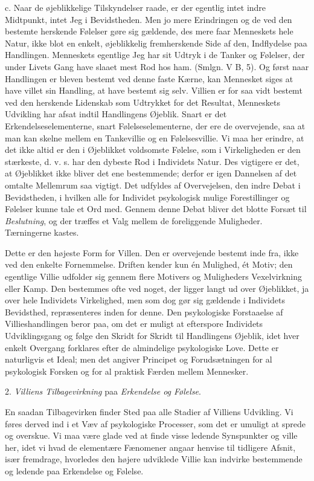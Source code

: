 \documentclass[12pt,a4paper,openany]{book}
\newcommand{\opage}[1]{\marginnote{\footnotesize\textit{[#1]}}}
\begin{document}
c. Naar de øjeblikkelige Tilskyndelser raade, er der egentlig intet
indre Midtpunkt, intet Jeg i Bevidstheden. Men jo mere Erindringen og de
ved den bestemte herskende Følelser gøre sig gældende, des mere faar
Menneskets hele Natur, ikke blot en enkelt, øjeblikkelig fremherskende
Side af den, Indflydelse paa Handlingen. Menneskets egentlige Jeg har
sit Udtryk i de Tanker og Følelser, der under Livets Gang have slaaet
mest Rod hos ham. (Smlgn. V B, 5). Og først naar Handlingen er bleven
bestemt ved denne faste Kærne, kan Mennesket siges at have villet sin
Handling, at have bestemt sig selv. Villien er for saa vidt bestemt ved
den herskende Lidenskab som Udtrykket for det Resultat,
\opage{384}Menneskets Udvikling har afsat indtil Handlingens Øjeblik.
Snart er det Erkendelseselementerne, snart Følelseselementerne, der ere
de overvejende, saa at man kan skelne mellem en Tankevillie og en
Følelsesvillie. Vi maa her erindre, at det ikke altid er den i
Øjeblikket voldsomste Følelse, som i Virkeligheden er den stærkeste, d.
v. s. har den dybeste Rod i Individets Natur. Des vigtigere er det, at
Øjeblikket ikke bliver det ene bestemmende; derfor er igen Dannelsen af
det omtalte Mellemrum saa vigtigt. Det udfyldes af Overvejelsen, den
indre Debat i Bevidstheden, i hvilken alle for Individet psykologisk
mulige Forestillinger og Følelser kunne tale et Ord med. Gennem denne
Debat bliver det blotte Forsæt til \emph{Beslutning}, og der træffes et
Valg mellem de foreliggende Muligheder. Tærningerne kastes.

Dette er den højeste Form for Villen. Den er overvejende bestemt inde
fra, ikke ved den enkelte Fornemmelse. Driften kender kun én Mulighed,
ét Motiv; den egentlige Villie udfolder sig gennem flere Motivers og
Muligheders Vexelvirkning eller Kamp. Den bestemmes ofte ved noget, der
ligger langt ud over Øjeblikket, ja over hele Individets Virkelighed,
men som dog gør sig gældende i Individets Bevidsthed, repræsenteres
inden for denne. Den psykologiske Forstaaelse af Villieshandlingen beror
paa, om det er muligt at efterspore Individets Udviklingsgang og følge
den Skridt for Skridt til Handlingens Øjeblik, idet hver enkelt Overgang
forklares efter de almindelige psykologiske Love. Dette er naturligvis
et Ideal; men det angiver Principet og Forudsætningen for al psykologisk
Forsken og for al praktisk Færden mellem Mennesker.

2. \emph{Villiens Tilbagevirkning} paa \emph{Erkendelse og Følelse}.

En saadan Tilbagevirken finder Sted paa alle Stadier af Villiens
Udvikling. Vi føres derved ind i et Væv af psykologiske Processer, som
det er umuligt at sprede og overskue. Vi maa være glade ved at finde
visse ledende Synspunkter og ville her, idet vi hvad de elementære
Fænomener angaar henvise til tidligere Afsnit, især fremdrage, hvorledes
den højere udviklede Villie kan indvirke bestemmende og ledende paa
Erkendelse og Følelse.
\end{document}
